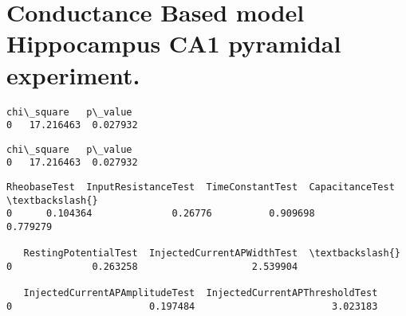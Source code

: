     \hypertarget{conductance-based-model-hippocampus-ca1-pyramidal-experiment.}{%
\section{Conductance Based model Hippocampus CA1 pyramidal
experiment.}\label{conductance-based-model-hippocampus-ca1-pyramidal-experiment.}}

            \begin{tcolorbox}
\begin{Verbatim}[commandchars=\\\{\}]
   chi\_square   p\_value
0   17.216463  0.027932
\end{Verbatim}
\end{tcolorbox}
        
    

            \begin{tcolorbox}[breakable, size=fbox, boxrule=.5pt, pad at break*=1mm, opacityfill=0]
\begin{Verbatim}[commandchars=\\\{\}]
   chi\_square   p\_value
0   17.216463  0.027932
\end{Verbatim}
\end{tcolorbox}
        
            \begin{tcolorbox}[breakable, size=fbox, boxrule=.5pt, pad at break*=1mm, opacityfill=0]
\begin{Verbatim}[commandchars=\\\{\}]
   RheobaseTest  InputResistanceTest  TimeConstantTest  CapacitanceTest  \textbackslash{}
0      0.104364              0.26776          0.909698         0.779279

   RestingPotentialTest  InjectedCurrentAPWidthTest  \textbackslash{}
0              0.263258                    2.539904

   InjectedCurrentAPAmplitudeTest  InjectedCurrentAPThresholdTest
0                        0.197484                        3.023183
\end{Verbatim}
\end{tcolorbox}
        
